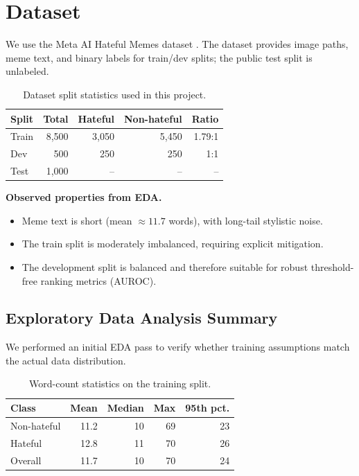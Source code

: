 \documentclass[11pt]{article}
\begin{document}
\section{Dataset}
We use the Meta AI Hateful Memes dataset \cite{kiela2020hateful}. The dataset provides image paths, meme text, and binary labels for train/dev splits; the public test split is unlabeled.

\begin{table}[h]
\centering
\small
\caption{Dataset split statistics used in this project.}
\begin{tabular}{lrrrr}
\toprule
Split & Total & Hateful & Non-hateful & Ratio \\
\midrule
Train & 8,500 & 3,050 & 5,450 & 1.79:1 \\
Dev   & 500   & 250   & 250   & 1:1 \\
Test  & 1,000 & --    & --    & -- \\
\bottomrule
\end{tabular}
\label{tab:data}
\end{table}

\textbf{Observed properties from EDA.}
\begin{itemize}[leftmargin=*,nosep]
  \item Meme text is short (mean \(\approx 11.7\) words), with long-tail stylistic noise.
  \item The train split is moderately imbalanced, requiring explicit mitigation.
  \item The development split is balanced and therefore suitable for robust threshold-free ranking metrics (AUROC).
\end{itemize}

\subsection{Exploratory Data Analysis Summary}
We performed an initial EDA pass to verify whether training assumptions match the actual data distribution.

\begin{table}[h]
\centering
\small
\caption{Word-count statistics on the training split.}
\begin{tabular}{lrrrr}
\toprule
Class & Mean & Median & Max & 95th pct. \\
\midrule
Non-hateful & 11.2 & 10 & 69 & 23 \\
Hateful & 12.8 & 11 & 70 & 26 \\
Overall & 11.7 & 10 & 70 & 24 \\
\bottomrule
\end{tabular}
\label{tab:wordstats}
\end{table}
\end{document}
